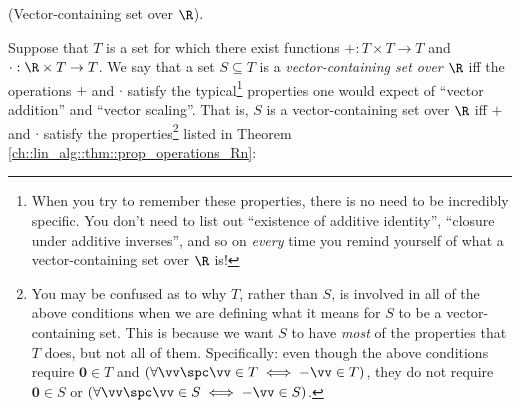 \begin{defn}
\label{ch::lin_alg::defn::vector_containing_set_R}
    (Vector-containing set over $\R$).
    
    Suppose that $T$ is a set for which there exist functions $+:T \times T \rightarrow T$ and $\cdot:\R \times T \rightarrow T$. We say that a set $S \subseteq T$ is a \textit{vector-containing set over $\R$} iff the operations $+$ and $\cdot$ satisfy the typical\footnote{When you try to remember these properties, there is no need to be incredibly specific. You don't need to list out ``existence of additive identity'', ``closure under additive inverses'', and so on \textit{every} time you remind yourself of what a vector-containing set over $\R$ is!} properties one would expect of ``vector addition'' and ``vector scaling''. That is, $S$ is a vector-containing set over $\R$ iff $+$ and $\cdot$ satisfy the properties\footnote{You may be confused as to why $T$, rather than $S$, is involved in all of the above conditions when we are defining what it means for $S$ to be a vector-containing set. This is because we want $S$ to have \textit{most} of the properties that $T$ does, but not all of them. Specifically: even though the above conditions require $\mathbf{0} \in T$ and $(\forall \vv \spc \vv \in T \iff -\vv \in T)$, they do not require $\mathbf{0} \in S$ or $(\forall \vv \spc \vv \in S \iff -\vv \in S)$.} listed in Theorem \ref{ch::lin_alg::thm::prop_operations_Rn}:
    

\end{defn}
